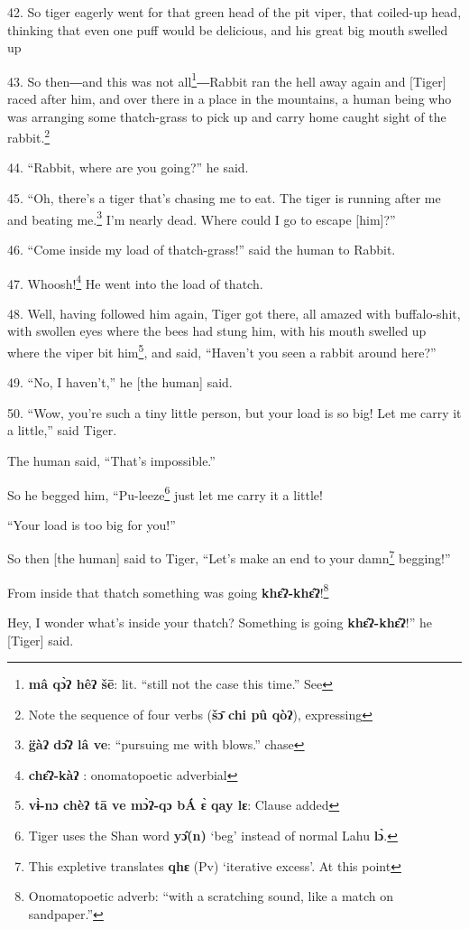 {42. So tiger eagerly went for that green head of the pit viper, that coiled-up
head, thinking that even one puff would be delicious, and his great big mouth swelled
up

43. So then―and this was not all\footnote{\textbf{mâ qɔ̀ʔ hêʔ šē}: lit. ``still not the case this time.'' See}―Rabbit ran the hell away again and [Tiger]
raced after him, and over there in a place in the mountains, a human being who
was arranging some thatch-grass to pick up and carry home caught sight of the rabbit.\footnote{Note the sequence of four verbs (\textbf{šɔ̄ chi pû qòʔ}), expressing}

44. ``Rabbit, where are you going?'' he said.

45. ``Oh, there's a tiger that's chasing me to eat. The tiger is running after
me and beating me.\footnote{\textbf{ g̈àʔ  dɔ̂ʔ  lâ    ve}: ``pursuing me with blows.'' chase} I'm nearly dead. Where could I go to escape [him]?''

46. ``Come inside my load of thatch-grass!'' said the human to Rabbit.

47. Whoosh!\footnote{\textbf{chɛ̂ʔ-kàʔ} : onomatopoetic adverbial} He went into the load of thatch.

48. Well, having followed him again, Tiger got there, all amazed with buffalo-shit,
with swollen eyes where the bees had stung him, with his mouth swelled up where
the viper bit him\footnote{\textbf{ vɨ̀-nɔ chèʔ tā ve mɔ̀ʔ-qɔ bÁ ɛ̀ qay lɛ}: Clause added}, and said, ``Haven't you seen a rabbit around here?''

49. ``No, I haven't,'' he [the human] said.

50. ``Wow, you're such a tiny little person, but your load is so big! Let me carry
it a little,'' said Tiger.

The human said, ``That's impossible.''

So he begged him, ``Pu-leeze\footnote{Tiger uses the Shan word \textbf{yɔ̂(n)} `beg' instead of normal Lahu \textbf{lɔ̀}.} just let me carry it a little!

``Your load is too big for you!''

So then [the human] said to Tiger, ``Let's make an end to your damn\footnote{This expletive translates \textbf{qhɛ} (Pv) `iterative excess'. At this point} begging!''

From inside that thatch something was going \textbf{khɛ̂ʔ-khɛ̂ʔ}!\footnote{Onomatopoetic adverb: ``with a scratching sound, like a match on sandpaper.''}

Hey, I wonder what's inside your thatch? Something is going \textbf{khɛ̂ʔ-khɛ̂ʔ}!''
he [Tiger] said.

}
